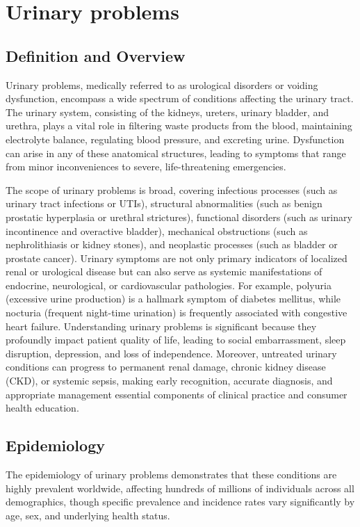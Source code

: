 \chapter{Urinary problems}

\section*{Definition and Overview}
Urinary problems, medically referred to as urological disorders or voiding dysfunction, encompass a wide spectrum of conditions affecting the urinary tract. The urinary system, consisting of the kidneys, ureters, urinary bladder, and urethra, plays a vital role in filtering waste products from the blood, maintaining electrolyte balance, regulating blood pressure, and excreting urine. Dysfunction can arise in any of these anatomical structures, leading to symptoms that range from minor inconveniences to severe, life-threatening emergencies.

The scope of urinary problems is broad, covering infectious processes (such as urinary tract infections or UTIs), structural abnormalities (such as benign prostatic hyperplasia or urethral strictures), functional disorders (such as urinary incontinence and overactive bladder), mechanical obstructions (such as nephrolithiasis or kidney stones), and neoplastic processes (such as bladder or prostate cancer). Urinary symptoms are not only primary indicators of localized renal or urological disease but can also serve as systemic manifestations of endocrine, neurological, or cardiovascular pathologies. For example, polyuria (excessive urine production) is a hallmark symptom of diabetes mellitus, while nocturia (frequent night-time urination) is frequently associated with congestive heart failure. Understanding urinary problems is significant because they profoundly impact patient quality of life, leading to social embarrassment, sleep disruption, depression, and loss of independence. Moreover, untreated urinary conditions can progress to permanent renal damage, chronic kidney disease (CKD), or systemic sepsis, making early recognition, accurate diagnosis, and appropriate management essential components of clinical practice and consumer health education.

\section*{Epidemiology}
The epidemiology of urinary problems demonstrates that these conditions are highly prevalent worldwide, affecting hundreds of millions of individuals across all demographics, though specific prevalence and incidence rates vary significantly by age, sex, and underlying health status.

